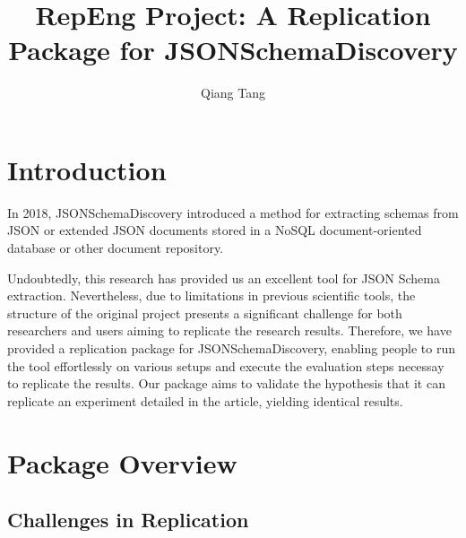 \documentclass[sigconf, nonacm]{acmart}
\begin{document}
\title{RepEng Project: A Replication Package for JSONSchemaDiscovery}


\author{Qiang Tang}

\maketitle


\section{Introduction}

In 2018, JSONSchemaDiscovery\cite{jsonschema} introduced a method for extracting schemas from JSON or extended JSON documents stored in a NoSQL document-oriented database or other document repository.

Undoubtedly, this research has provided us an excellent tool for JSON Schema extraction. Nevertheless, due to limitations in previous scientific tools, the structure of the original project presents a significant challenge for both researchers and users aiming to replicate the research results. Therefore, we have provided a replication package for JSONSchemaDiscovery, enabling people to run the tool effortlessly on various setups and execute the evaluation steps necessay to replicate the results. Our package aims to validate the hypothesis that it can replicate an experiment detailed in the article, yielding identical results.

\section{Package Overview}

\subsection{Challenges in Replication}
\end{document}
